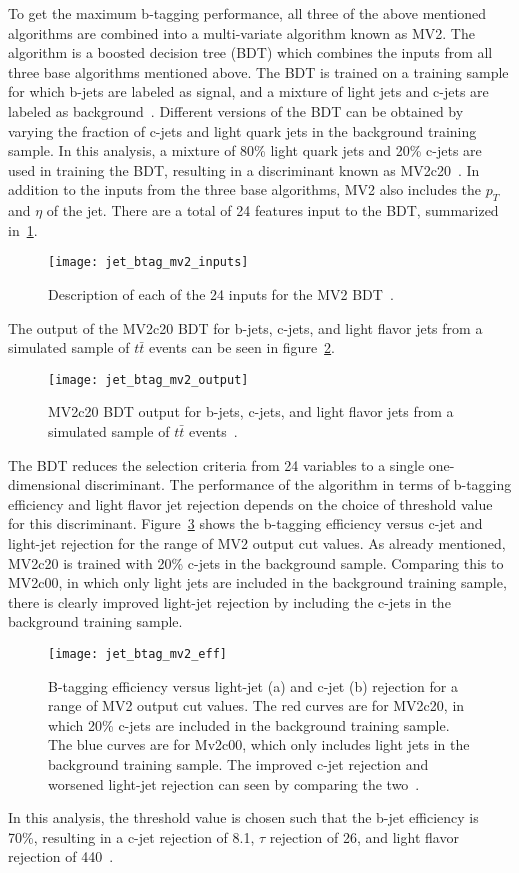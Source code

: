 To get the maximum b-tagging performance, all three of the above mentioned algorithms are combined into a multi-variate algorithm known as MV2.
The algorithm is a boosted decision tree (BDT) which combines the inputs from all three base algorithms mentioned above.
The BDT is trained on a training sample for which b-jets are labeled as signal, and a mixture of light jets and c-jets are labeled as background~\cite{jet-btag-mv2}.
Different versions of the BDT can be obtained by varying the fraction of c-jets and light quark jets in the background training sample.
In this analysis, a mixture of 80\% light quark jets and 20\% c-jets are used in training the BDT, resulting in a discriminant known as MV2c20~\cite{jet-btag-mv2}.
In addition to the inputs from the three base algorithms, MV2 also includes the $p_T$ and $\eta$ of the jet.
There are a total of 24 features input to the BDT, summarized in~\ref{fig:jet_btag_mv2_inputs}.
\begin{figure}[!ht]
    \centering
\texttt{[image: jet\_btag\_mv2\_inputs]}
\caption{Description of each of the 24 inputs for the MV2 BDT~\cite{jet-btag-mv2}.}
\label{fig:jet_btag_mv2_inputs}
\end{figure}
The output of the MV2c20 BDT for b-jets, c-jets, and light flavor jets from a simulated sample of $t\bar{t}$ events can be seen in figure~\ref{fig:jet_btag_mv2_output}.

\begin{figure}[!ht]
    \centering
\texttt{[image: jet\_btag\_mv2\_output]}
\caption{MV2c20 BDT output for b-jets, c-jets, and light flavor jets from a simulated sample of $t\bar{t}$ events~\cite{jet-btag-mv2}.}
\label{fig:jet_btag_mv2_output}
\end{figure}

The BDT reduces the selection criteria from 24 variables to a single one-dimensional discriminant.
The performance of the algorithm in terms of b-tagging efficiency and light flavor jet rejection depends on the choice of threshold value for this discriminant.
Figure~\ref{fig:jet_btag_mv2_eff} shows the b-tagging efficiency versus c-jet and light-jet rejection for the range of MV2 output cut values.
As already  mentioned, MV2c20 is trained with 20\% c-jets in the background sample.
Comparing this to MV2c00, in which only light jets are included in the background training sample, there is clearly improved light-jet rejection by including the c-jets in the background training sample.

\begin{figure}[!ht]
    \centering
\texttt{[image: jet\_btag\_mv2\_eff]}
\caption{B-tagging efficiency versus light-jet (a) and c-jet (b) rejection for a range of MV2 output cut values.
The red curves are for MV2c20, in which 20\% c-jets are included in the background training sample.
The blue curves are for Mv2c00, which only includes light jets in the background training sample.
The improved c-jet rejection and worsened light-jet rejection can seen by comparing the two~\cite{jet-btag-mv2}.}
\label{fig:jet_btag_mv2_eff}
\end{figure}

In this analysis, the threshold value is chosen such that the b-jet efficiency is 70\%, resulting in a c-jet rejection of 8.1, $\tau$ rejection of 26, and light flavor rejection of 440~\cite{jet-btag-mv2}.